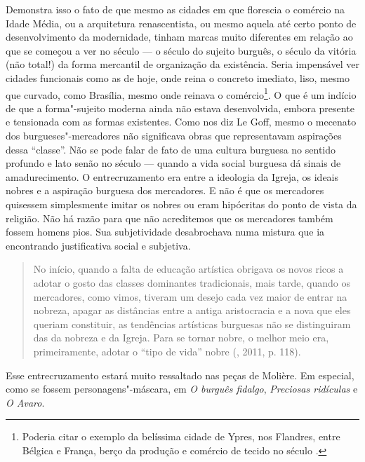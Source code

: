 Demonstra isso o fato de que mesmo as cidades em que florescia o
comércio na Idade Média, ou a arquitetura renascentista, ou mesmo aquela
até certo ponto de desenvolvimento da modernidade, tinham marcas muito
diferentes em relação ao que se começou a ver no século  --- o século
do sujeito burguês, o século da vitória (não total!) da forma mercantil
de organização da existência. Seria impensável ver cidades funcionais
como as de hoje, onde reina o concreto imediato, liso, mesmo que
curvado, como Brasília, mesmo onde reinava o comércio\footnote{Poderia
  citar o exemplo da belíssima cidade de Ypres, nos Flandres, entre
  Bélgica e França, berço da produção e comércio de tecido no século
  .}. O que é um indício de que a forma"-sujeito moderna ainda não
estava desenvolvida, embora presente e tensionada com as formas
existentes. Como nos diz Le Goff, mesmo o mecenato dos
burgueses"-mercadores não significava obras que representavam aspirações
dessa ``classe''. Não se pode falar de fato de uma cultura burguesa no
sentido profundo e lato senão no século  --- quando a vida
social burguesa dá sinais de amadurecimento. O entrecruzamento era entre
a ideologia da Igreja, os ideais nobres e a aspiração burguesa dos
mercadores. E não é que os mercadores quisessem simplesmente imitar os
nobres ou eram hipócritas do ponto de vista da religião. Não há razão
para que não acreditemos que os mercadores também fossem homens pios.
Sua subjetividade desabrochava numa mistura que ia encontrando
justificativa social e subjetiva.

\begin{quote}
No início, quando a falta de educação artística obrigava os novos ricos
a adotar o gosto das classes dominantes tradicionais, mais tarde, quando
os mercadores, como vimos, tiveram um desejo cada vez maior de entrar na
nobreza, apagar as distâncias entre a antiga aristocracia e a nova que
eles queriam constituir, as tendências artísticas burguesas não se
distinguiram das da nobreza e da Igreja. Para se tornar nobre, o melhor
meio era, primeiramente, adotar o ``tipo de vida'' nobre (,
2011, p. 118).
\end{quote}

Esse entrecruzamento estará muito ressaltado nas peças de Molière. Em
especial, como se fossem personagens"-máscara, em \emph{O burguês
fidalgo}, \emph{Preciosas ridículas} e \emph{O Avaro}.

